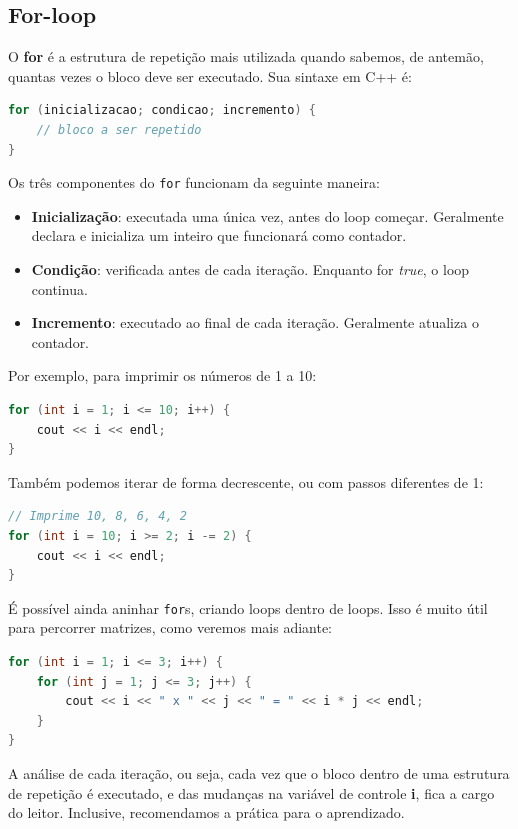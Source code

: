 \documentclass[12pt]{article}
\begin{document}
\subsection{For-loop}

O \textbf{for} é a estrutura de repetição mais utilizada quando sabemos, de antemão, quantas vezes o bloco deve ser executado. Sua sintaxe em C++ é:

\begin{lstlisting}[language=C++]
for (inicializacao; condicao; incremento) {
    // bloco a ser repetido
}
\end{lstlisting}

Os três componentes do \texttt{for} funcionam da seguinte maneira:
\begin{itemize}
    \item \textbf{Inicialização}: executada uma única vez, antes do loop começar. Geralmente declara e inicializa um inteiro que funcionará como contador.
    \item \textbf{Condição}: verificada antes de cada iteração. Enquanto for \textit{true}, o loop continua.
    \item \textbf{Incremento}: executado ao final de cada iteração. Geralmente atualiza o contador.
\end{itemize}

Por exemplo, para imprimir os números de 1 a 10:

\begin{lstlisting}[language=C++]
for (int i = 1; i <= 10; i++) {
    cout << i << endl;
}
\end{lstlisting}

Também podemos iterar de forma decrescente, ou com passos diferentes de 1:

\begin{lstlisting}[language=C++]
// Imprime 10, 8, 6, 4, 2
for (int i = 10; i >= 2; i -= 2) {
    cout << i << endl;
}
\end{lstlisting}

É possível ainda aninhar \texttt{for}s, criando loops dentro de loops. Isso é muito útil para percorrer matrizes, como veremos mais adiante:

\begin{lstlisting}[language=C++]
for (int i = 1; i <= 3; i++) {
    for (int j = 1; j <= 3; j++) {
        cout << i << " x " << j << " = " << i * j << endl;
    }
}
\end{lstlisting}

A análise de cada iteração, ou seja, cada vez que o bloco dentro de uma estrutura de repetição é executado, e das mudanças na variável de controle \textbf{i}, fica a cargo do leitor. Inclusive, recomendamos a prática para o aprendizado.
\end{document}
